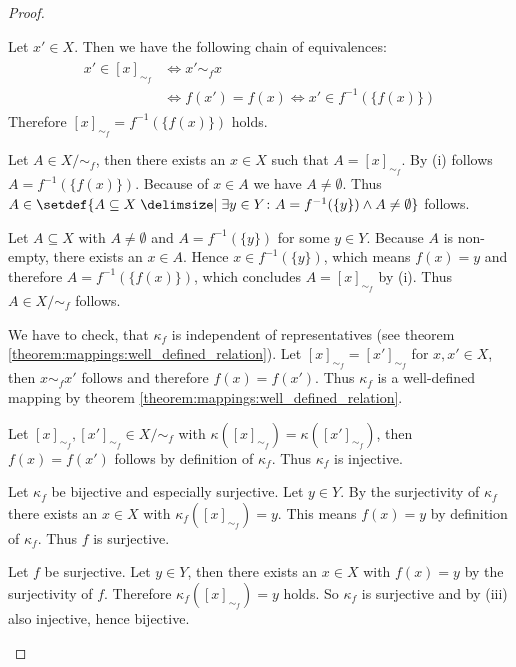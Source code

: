 \begin{proof}
    \begin{proofenumerate}
        \item Let $x'\in X$. Then we have the following chain of equivalences:
        \begin{align}\begin{split}
        x'\in [x]_{\sim_f}&\iff x'\sim_f x\\
        &\iff f(x')=f(x)\iff x'\in f^{-1}(\{f(x)\})
        \end{split}\end{align}
        Therefore $[x]_{\sim_f}=f^{-1}(\{f(x)\})$ holds.
        \item \proofsubset Let $A\in X/{\sim_f}$, then there exists an $x\in X$ such that $A=[x]_{\sim_f}$. By (i) follows $A=f^{-1}(\{f(x)\})$. Because of $x\in A$ we have $A\neq\emptyset$. Thus $A\in\setdef{A\subseteq X\given \exists y\in Y\colon A=f^{-1}(\{y\})\land A\neq\emptyset}$ follows.
        
        \proofsupset Let $A\subseteq X$ with $A\neq\emptyset$ and $A=f^{-1}(\{y\})$ for some $y\in Y$. Because $A$ is non-empty, there exists an $x\in A$. Hence $x\in f^{-1}(\{y\})$, which means $f(x)=y$ and therefore $A=f^{-1}(\{f(x)\})$, which concludes $A=[x]_{\sim_f}$ by (i). Thus $A\in X/{\sim_f}$ follows.
        
        \item We have to check, that $\kappa_f$ is independent of representatives (see theorem \ref{theorem:mappings:well_defined_relation}). Let $[x]_{\sim_f}=[x']_{\sim_f}$ for $x,x'\in X$, then $x\sim_f x'$ follows and therefore $f(x)=f(x')$. Thus $\kappa_f$ is a well-defined mapping by theorem \ref{theorem:mappings:well_defined_relation}.
        
        Let $[x]_{\sim_f},[x']_{\sim_f}\in X/{\sim_f}$ with $\kappa([x]_{\sim_f})=\kappa([x']_{\sim_f})$, then $f(x)=f(x')$ follows by definition of $\kappa_f$. Thus $\kappa_f$ is injective.

        \item \proofright Let $\kappa_f$ be bijective and especially surjective. Let $y\in Y$. By the surjectivity of $\kappa_f$ there exists an $x\in X$ with $\kappa_f([x]_{\sim_f})=y$. This means $f(x)=y$ by definition of $\kappa_f$. Thus $f$ is surjective.
        
        \proofleft Let $f$ be surjective. Let $y\in Y$, then there exists an $x\in X$ with $f(x)=y$ by the surjectivity of $f$. Therefore $\kappa_f([x]_{\sim_f})=y$ holds. So $\kappa_f$ is surjective and by (iii) also injective, hence bijective.
    \end{proofenumerate}
\end{proof}

